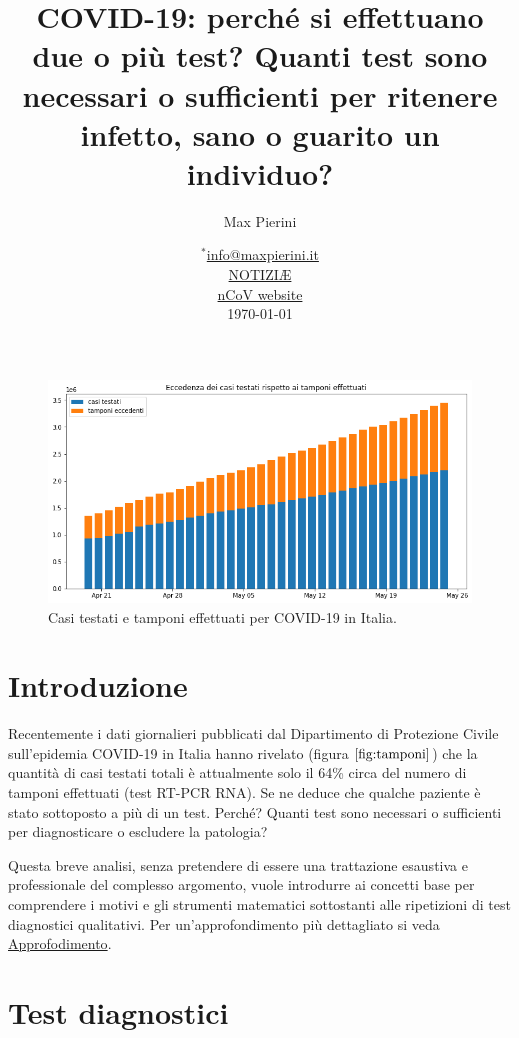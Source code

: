 \documentclass[11pt]{article}
\title{COVID-19: perché si effettuano due o più test? Quanti test sono necessari o sufficienti per ritenere infetto, sano o guarito un individuo?}
\author{Max Pierini}
\date{%
    $^*$\href{mailto:info@maxpierini.it}{info@maxpierini.it}\\%
    \href{https://t.me/notiziae}{NOTIZI\AE}\\%
    \href{https://maxpierini.it/ncov}{nCoV website}\\[2ex]%
    \today
}
\begin{document}
    
    \maketitle
    
    

    
    
        \begin{figure}
        \centering
            \includegraphics{tamponi.png}
            \caption{Casi testati e tamponi effettuati per COVID-19 in Italia.}
            \label{fig:tamponi}
        \end{figure}

    
    \hypertarget{introduzione}{%
\section{Introduzione}\label{introduzione}}

Recentemente i dati giornalieri pubblicati dal Dipartimento di
Protezione Civile sull'epidemia COVID-19 in Italia \cite{pcm_dpc_2020}
hanno rivelato (figura \(\ref{fig:tamponi}\)) che la quantità di casi
testati totali è attualmente solo il 64\% circa del numero di tamponi
effettuati (test RT-PCR RNA). Se ne deduce che qualche paziente è stato
sottoposto a più di un test. Perché? Quanti test sono necessari o
sufficienti per diagnosticare o escludere la patologia?

Questa breve analisi, senza pretendere di essere una trattazione
esaustiva e professionale del complesso argomento, vuole introdurre ai
concetti base per comprendere i motivi e gli strumenti matematici
sottostanti alle ripetizioni di test diagnostici qualitativi. Per
un'approfondimento più dettagliato si veda
\href{https://maxpierini.it/ncov/approfondimento-test.pdf}{Approfodimento}.

\hypertarget{test-diagnostici}{%
\section{Test diagnostici}\label{test-diagnostici}}
\end{document}

